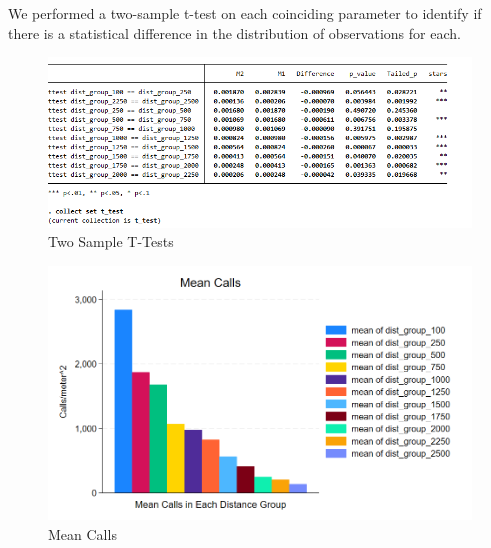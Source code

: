 \documentclass[12pt]{article}
\begin{document}
We performed a two-sample t-test on each coinciding parameter to identify if there is a statistical difference in the distribution of observations for each. 
\begin{figure}
    \centering
    \includegraphics[width=1\linewidth]{Reproducibility Package//Visual Graphics/t_test_ss.png}
    \caption{Two Sample T-Tests}
    \label{fig:enter-label}
\end{figure}
\begin{figure}
    \centering
    \includegraphics[width=1\linewidth]{Reproducibility Package//Visual Graphics/Mean Calls.png}
    \caption{Mean Calls}
    \label{fig:enter-label}
\end{figure}
\end{document}
